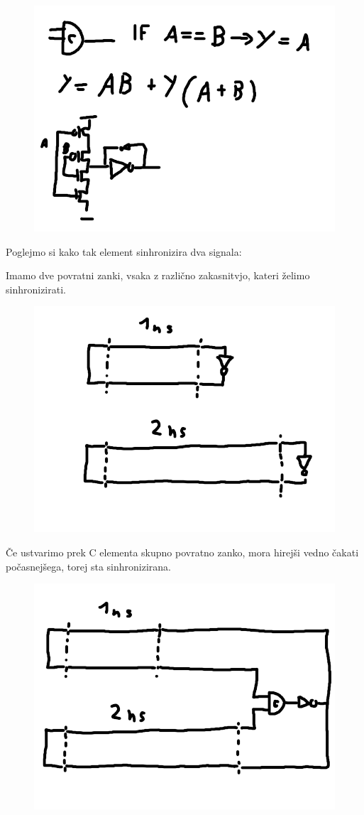 \begin{figure}
	\centering
	\includegraphics[width=0.7\linewidth]{slike/C_Element}
	\caption{}
	\label{fig:celement}
\end{figure}

Poglejmo si kako tak element sinhronizira dva signala:

Imamo dve povratni zanki, vsaka z različno zakasnitvjo, kateri želimo sinhronizirati.

\begin{figure}
	\centering
	\includegraphics[width=0.7\linewidth]{slike/dly1}
	\caption{}
	\label{fig:celement}
\end{figure}

Če ustvarimo prek C elementa skupno povratno zanko, mora hirejši vedno čakati počasnejšega, torej sta sinhronizirana.

\begin{figure}
	\centering
	\includegraphics[width=0.7\linewidth]{slike/dly2}
	\caption{}
	\label{fig:celement}
\end{figure}

